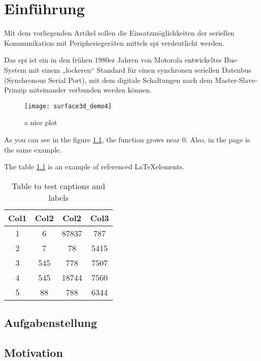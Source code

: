 \chapter{Einführung}

Mit dem vorliegenden Artikel sollen die Einsatzmöglichkeiten der seriellen Kommunikation mit Peripheriegeräten mittels \ac{spi} verdeutlicht werden.

Das \ac{spi} ist ein in den frühen 1980er Jahren von Motorola entwickeltes Bus-System mit einem „lockeren“ Standard für einen synchronen seriellen Datenbus (Synchronous Serial Port), mit dem digitale Schaltungen nach dem Master-Slave-Prinzip miteinander verbunden werden können.

\begin{figure}[h]
    \centering
    \texttt{[image: surface3d\_demo4]}
    \caption{a nice plot}
    \label{fig:mesh1}
\end{figure}
 
As you can see in the figure \ref{fig:mesh1}, the function grows near 0. Also, in the page \pageref{fig:mesh1} is the same example.

The table \ref{table:1} is an example of referenced \LaTeX elements.
 
\begin{table}[!ht]
\centering
\begin{tabular}{||c c c c||} 
 \hline
 Col1 & Col2 & Col2 & Col3 \\ [0.5ex] 
 \hline\hline
 1 & 6 & 87837 & 787 \\ 
 2 & 7 & 78 & 5415 \\
 3 & 545 & 778 & 7507 \\
 4 & 545 & 18744 & 7560 \\
 5 & 88 & 788 & 6344 \\ [1ex] 
 \hline
\end{tabular}
\caption{Table to test captions and labels}
\label{table:1}
\end{table}

\section{Aufgabenstellung}

\section{Motivation}


